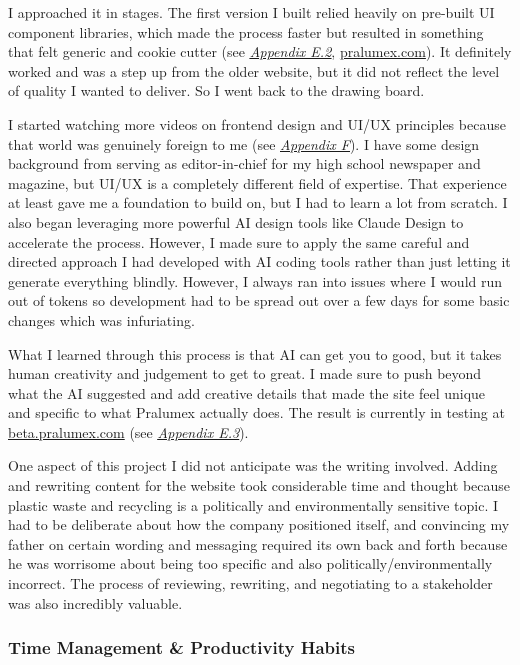 \documentclass[12pt]{article}
\let\oldhyperref\hyperref
\renewcommand{\hyperref}[2][]{\oldhyperref[#1]{\textit{\uline{#2}}}}
\begin{document}
            I approached it in stages. The first version I built relied heavily on pre-built UI component libraries, which made the process faster but resulted in something that felt generic and cookie cutter (see \hyperref[appendix:e2]{Appendix E.2}, \href{https://pralumex.com}{pralumex.com}). It definitely worked and was a step up from the older website, but it did not reflect the level of quality I wanted to deliver. So I went back to the drawing board.

            I started watching more videos on frontend design and UI/UX principles because that world was genuinely foreign to me (see \hyperref[appendix:f]{Appendix F}). I have some design background from serving as editor-in-chief for my high school newspaper and magazine, but UI/UX is a completely different field of expertise. That experience at least gave me a foundation to build on, but I had to learn a lot from scratch. I also began leveraging more powerful AI design tools like Claude Design to accelerate the process. However, I made sure to apply the same careful and directed approach I had developed with AI coding tools rather than just letting it generate everything blindly. However, I always ran into issues where I would run out of tokens so development had to be spread out over a few days for some basic changes which was infuriating.

            What I learned through this process is that AI can get you to good, but it takes human creativity and judgement to get to great. I made sure to push beyond what the AI suggested and add creative details that made the site feel unique and specific to what Pralumex actually does. The result is currently in testing at \href{https://beta.pralumex.com}{beta.pralumex.com} (see \hyperref[appendix:e3]{Appendix E.3}).

            One aspect of this project I did not anticipate was the writing involved. Adding and rewriting content for the website took considerable time and thought because plastic waste and recycling is a politically and environmentally sensitive topic. I had to be deliberate about how the company positioned itself, and convincing my father on certain wording and messaging required its own back and forth because he was worrisome about being too specific and also politically/environmentally incorrect. The process of reviewing, rewriting, and negotiating to a stakeholder was also incredibly valuable.

            \subsubsection{Time Management \& Productivity Habits}
            \label{sec:time-management}
\end{document}
